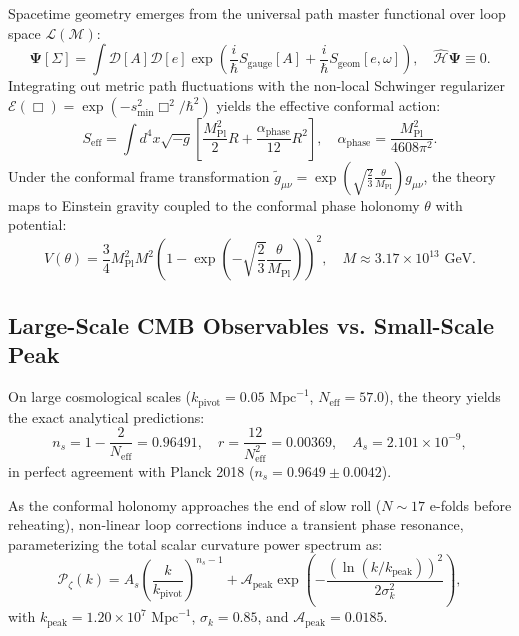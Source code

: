 \documentclass[11pt,a4paper]{article}
\begin{document}
Spacetime geometry emerges from the universal path master functional over loop space $\mathcal{L}(\mathcal{M})$:
\begin{equation}
\mathbf{\Psi}[\Sigma] = \int \mathcal{D}[A] \mathcal{D}[e] \exp\left( \frac{i}{\hbar} S_{\mathrm{gauge}}[A] + \frac{i}{\hbar} S_{\mathrm{geom}}[e, \omega] \right), \quad \hat{\mathcal{H}} \mathbf{\Psi} \equiv 0.
\end{equation}
Integrating out metric path fluctuations with the non-local Schwinger regularizer $\mathcal{E}(\Box) = \exp(-s_{\min}^2 \Box^2 / \hbar^2)$ yields the effective conformal action:
\begin{equation}
S_{\mathrm{eff}} = \int d^4x \sqrt{-g} \left[ \frac{M_{\mathrm{Pl}}^2}{2} R + \frac{\alpha_{\mathrm{phase}}}{12} R^2 \right], \quad \alpha_{\mathrm{phase}} = \frac{M_{\mathrm{Pl}}^2}{4608\pi^2}.
\end{equation}
Under the conformal frame transformation $\tilde{g}_{\mu\nu} = \exp\left(\sqrt{\frac{2}{3}}\frac{\theta}{M_{\mathrm{Pl}}}\right) g_{\mu\nu}$, the theory maps to Einstein gravity coupled to the conformal phase holonomy $\theta$ with potential:
\begin{equation}
V(\theta) = \frac{3}{4} M_{\mathrm{Pl}}^2 M^2 \left( 1 - \exp\left(-\sqrt{\frac{2}{3}}\frac{\theta}{M_{\mathrm{Pl}}}\right) \right)^2, \quad M \approx 3.17 \times 10^{13}\text{ GeV}.
\end{equation}

\subsection{Large-Scale CMB Observables vs. Small-Scale Peak}
On large cosmological scales ($k_{\mathrm{pivot}} = 0.05\text{ Mpc}^{-1}$, $N_{\mathrm{eff}} = 57.0$), the theory yields the exact analytical predictions:
\begin{equation}
n_s = 1 - \frac{2}{N_{\mathrm{eff}}} = 0.96491, \quad r = \frac{12}{N_{\mathrm{eff}}^2} = 0.00369, \quad A_s = 2.101 \times 10^{-9},
\end{equation}
in perfect agreement with Planck 2018 ($n_s = 0.9649 \pm 0.0042$).

As the conformal holonomy approaches the end of slow roll ($N \sim 17$ e-folds before reheating), non-linear loop corrections induce a transient phase resonance, parameterizing the total scalar curvature power spectrum as:
\begin{equation}
\mathcal{P}_\zeta(k) = A_s \left( \frac{k}{k_{\mathrm{pivot}}} \right)^{n_s - 1} + \mathcal{A}_{\mathrm{peak}} \exp\left( - \frac{(\ln(k / k_{\mathrm{peak}}))^2}{2 \sigma_k^2} \right),
\end{equation}
with $k_{\mathrm{peak}} = 1.20 \times 10^7\text{ Mpc}^{-1}$, $\sigma_k = 0.85$, and $\mathcal{A}_{\mathrm{peak}} = 0.0185$.
\end{document}
